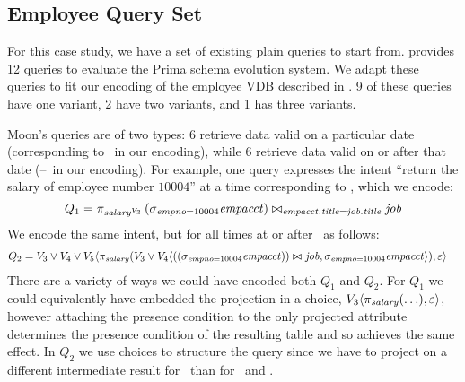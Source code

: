 \subsection{Employee Query Set}
\label{sec:emp-qs}


For this case study, we have a set of existing plain queries to start from.
\citet{prima08Moon} provides 12 queries to evaluate the Prima schema evolution
system. We adapt these queries to fit our encoding of the employee VDB
described in .
%
%
9 of these queries have one variant, 2 have two variants, and 1 has three
variants. 


Moon's queries are of two types: 6 retrieve data valid on a particular date
(corresponding to \vThree\ in our encoding), while 6 retrieve data valid on or
after that date (\vThree--\vFive\ in our encoding).
%
For example, one query expresses the intent ``return the salary of employee
number $10004$'' at a time corresponding to \vThree, which we encode:
\[
Q_1 = \vPrj[\oatt{\salary}{\vThree}]{%
  \joinRelR{\selectRel{\empno=10004}{\empacct}}{\job}
           {\empacct.\titleatt = \job.\titleatt}}
\]
%
%
We encode the same intent, but for all times at or after \vThree\ as follows:
%
\begin{align*}
Q_2 &=  \vThree\vee\vFour\vee\vFive \langle \pi_\salary 
 (\vThree\vee\vFour\langle
    \joinRelR{(\vSel[\empno=10004]{\empacct})}{\job}
             {}, 
{\vSel[\empno=10004]{\empacct}}\rangle), \empRel\rangle
\end{align*}
%
There are a variety of ways we could have encoded both $Q_1$ and $Q_2$.
%
For $Q_1$ we could equivalently have embedded the projection in a choice,
$\chc[\vThree]{\vPrj[\salary]{(\ldots)},\empRel}$, however attaching the presence
condition to the only projected attribute determines the presence condition of
the resulting table and so achieves the same effect.
%
In $Q_2$ we use choices to structure the query since we have to project on a
different intermediate result for \vFive\ than for \vThree\ and \vFour.

